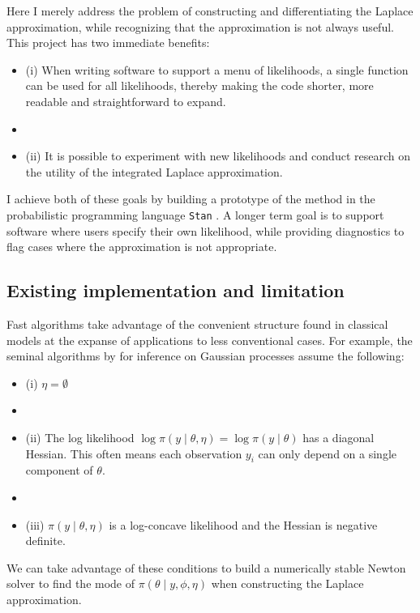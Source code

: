 \documentclass[stslayout, noinfoline]{imsart}
\theoremstyle{definition}
\begin{document}
Here I merely address the problem of constructing and differentiating the Laplace approximation,
while recognizing that the approximation is not always useful.
This project has two immediate benefits:
%
\begin{itemize}
  \item[] (i) When writing software to support a menu of likelihoods, a single function can be used for all likelihoods, thereby making the code shorter, more readable and straightforward to expand.
  \item[]
  \item[] (ii) It is possible to experiment with new likelihoods and conduct research on the utility of the integrated Laplace approximation.
\end{itemize}
%
I achieve both of these goals by building a prototype of the method in the probabilistic programming language \texttt{Stan} \citep{Carpenter:2015, Carpenter:2017}.
A longer term goal is to support software where users specify their own likelihood, while providing diagnostics to flag cases where the approximation is not appropriate.


\subsection{Existing implementation and limitation}  \label{sec:classical-limitation}

Fast algorithms take advantage of the convenient structure found in classical models at the expanse of applications to less conventional cases.
%
For example, the seminal algorithms by \citet{Rasmussen:2006} for inference on Gaussian processes assume the following:
%
\begin{itemize}
  \item[] (i) $\eta = \emptyset$
  \item[]
  \item[] (ii) The log likelihood $\log \pi(y \mid \theta, \eta) = \log \pi(y \mid \theta)$ has a diagonal Hessian. This often means each observation $y_i$ can only depend on a single component of $\theta$.
  \item[]
  \item[] (iii) $\pi(y \mid \theta, \eta)$ is a log-concave likelihood and the Hessian is negative definite.
\end{itemize}
%
We can take advantage of these conditions to build a numerically stable Newton solver to find the mode of $\pi(\theta \mid y, \phi, \eta)$ when constructing the Laplace approximation.
\end{document}
